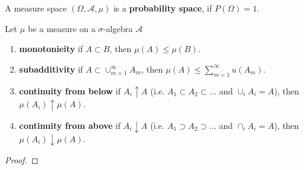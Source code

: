 \begin{remark}
	A measure space $(\Omega,\mathcal{A},\mu)$ is a \textbf{probability space}, if $P(\Omega)=1$.
\end{remark}

\begin{property}
	Let $\mu$ be a measure on a $\sigma$-algebra $\mathcal{A}$
	\begin{enumerate}
		\item \textbf{monotonieity} if $A\subset B$, then $\mu(A)\leq\mu(B)$.
		\item \textbf{subadditivity} if $A\subset\cup_{m=1}^{\infty} A_m$, then $\mu(A)\leq\sum_{m=1}^{\infty}  u(A_m)$.
		\item \textbf{continuity from below} if $A_i\uparrow A$ (i.e. $A_1\subset A_2\subset \ldots$ and $\cup_iA_i=A$), then $\mu(A_i)\uparrow \mu(A)$.
		\item \textbf{continuity from above} if $A_i\downarrow A$ (i.e. $A_1\supset A_2\supset \ldots$ and $\cap_iA_i=A$), then $\mu(A_i)\downarrow \mu(A)$.
	\end{enumerate}
\end{property}

\begin{proof}

\end{proof}
